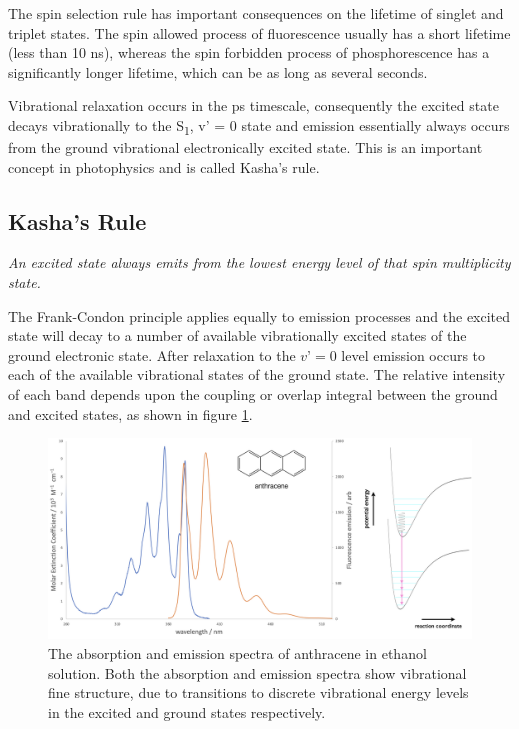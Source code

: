 \documentclass[
]{book}
\begin{document}
The spin selection rule has important consequences on the lifetime of singlet and triplet states. The spin allowed process of fluorescence usually has a short lifetime (less than 10 ns), whereas the spin forbidden process of phosphorescence has a significantly longer lifetime, which can be as long as several seconds.

Vibrational relaxation occurs in the ps timescale, consequently the excited state decays vibrationally to the S\textsubscript{1}, v' = 0 state and emission essentially always occurs from the ground vibrational electronically excited state. This is an important concept in photophysics and is called Kasha's rule.

\hypertarget{sec:Kasha}{%
\subsection{Kasha's Rule}\label{sec:Kasha}}

\emph{An excited state always emits from the lowest energy level of that spin multiplicity state.}

The Frank-Condon principle applies equally to emission processes and the excited state will decay to a number of available vibrationally excited states of the ground electronic state. After relaxation to the \(v’ = 0\) level emission occurs to each of the available vibrational states of the ground state. The relative intensity of each band depends upon the coupling or overlap integral between the ground and excited states, as shown in figure \ref{fig:anthracenekasha}.

\begin{figure}

{\centering \includegraphics[width=0.7\linewidth]{images/anthracenekasha} 

}

\caption{The absorption and emission spectra of anthracene in ethanol solution. Both the absorption and emission spectra show vibrational fine structure, due to transitions to discrete vibrational energy levels in the excited and ground states respectively.}\label{fig:anthracenekasha}
\end{figure}
\end{document}
